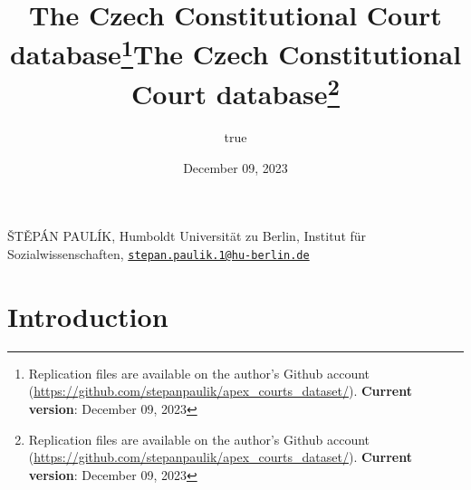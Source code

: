 \documentclass[
  11pt,
]{article}
\title{The Czech Constitutional Court database\thanks{Replication files
are available on the author's Github account
(\url{https://github.com/stepanpaulik/apex_courts_dataset/}).
\textbf{Current version}: December 09, 2023}}
\author{true}
\date{December 09, 2023}
\title{The Czech Constitutional Court database\thanks{Replication files
are available on the author's Github account
(\url{https://github.com/stepanpaulik/apex_courts_dataset/}).
\textbf{Current version}: December 09, 2023}  }
\date{}
\begin{document}



{%
\setlength{\parindent}{0pt}
\thispagestyle{plain}
{%
\maketitle  %

}




{
   \vskip 13.5pt\relax \normalsize\fontsize{11}{12}
   \MakeUppercase{Štěpán Paulík}, \small{Humboldt Universität zu Berlin,
Institut für Sozialwissenschaften,
\href{mailto:stepan.paulik.1@hu-berlin.de}{\nolinkurl{stepan.paulik.1@hu-berlin.de}}}   

}

}






\vskip -8.5pt

{
\hypersetup{linkcolor=black}
\setcounter{tocdepth}{2}
\tableofcontents
}


{
\setcounter{tocdepth}{2}
\tableofcontents
}

\setlength{\parindent}{16pt}
\setlength{\parskip}{0pt}

\hypertarget{introduction}{%
\section{Introduction}\label{introduction}}
\end{document}
